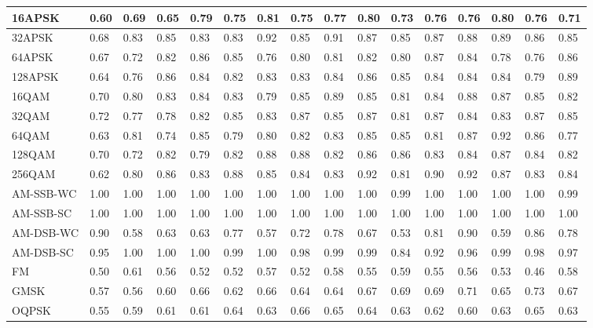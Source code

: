 \documentclass[conference]{IEEEtran}
\begin{document}
\begin{table}[H]
\begin{tabular}{|l|l|l|l|l|l|l|l|l|l|l|l|l|l|l|l|}
\hline 16APSK & 0.60 & 0.69 & 0.65 & 0.79 & 0.75 & 0.81 & 0.75 & 0.77 & 0.80 & 0.73 & 0.76 & 0.76 & 0.80 & 0.76 & 0.71 \\
\hline 32APSK & 0.68 & 0.83 & 0.85 & 0.83 & 0.83 & 0.92 & 0.85 & 0.91 & 0.87 & 0.85 & 0.87 & 0.88 & 0.89 & 0.86 & 0.85 \\
\hline 64APSK & 0.67 & 0.72 & 0.82 & 0.86 & 0.85 & 0.76 & 0.80 & 0.81 & 0.82 & 0.80 & 0.87 & 0.84 & 0.78 & 0.76 & 0.86 \\
\hline 128APSK & 0.64 & 0.76 & 0.86 & 0.84 & 0.82 & 0.83 & 0.83 & 0.84 & 0.86 & 0.85 & 0.84 & 0.84 & 0.84 & 0.79 & 0.89 \\
\hline 16QAM  & 0.70 & 0.80 & 0.83 & 0.84 & 0.83 & 0.79 & 0.85 & 0.89 & 0.85 & 0.81 & 0.84 & 0.88 & 0.87 & 0.85 & 0.82 \\
\hline 32QAM  & 0.72 & 0.77 & 0.78 & 0.82 & 0.85 & 0.83 & 0.87 & 0.85 & 0.87 & 0.81 & 0.87 & 0.84 & 0.83 & 0.87 & 0.85 \\
\hline 64QAM  & 0.63 & 0.81 & 0.74 & 0.85 & 0.79 & 0.80 & 0.82 & 0.83 & 0.85 & 0.85 & 0.81 & 0.87 & 0.92 & 0.86 & 0.77 \\
\hline 128QAM & 0.70 & 0.72 & 0.82 & 0.79 & 0.82 & 0.88 & 0.88 & 0.82 & 0.86 & 0.86 & 0.83 & 0.84 & 0.87 & 0.84 & 0.82 \\
\hline 256QAM & 0.62 & 0.80 & 0.86 & 0.83 & 0.88 & 0.85 & 0.84 & 0.83 & 0.92 & 0.81 & 0.90 & 0.92 & 0.87 & 0.83 & 0.84 \\
\hline AM-SSB-WC & 1.00 & 1.00 & 1.00 & 1.00 & 1.00 & 1.00 & 1.00 & 1.00 & 1.00 & 0.99 & 1.00 & 1.00 & 1.00 & 1.00 & 0.99 \\
\hline AM-SSB-SC & 1.00 & 1.00 & 1.00 & 1.00 & 1.00 & 1.00 & 1.00 & 1.00 & 1.00 & 1.00 & 1.00 & 1.00 & 1.00 & 1.00 & 1.00 \\
\hline AM-DSB-WC & 0.90 & 0.58 & 0.63 & 0.63 & 0.77 & 0.57 & 0.72 & 0.78 & 0.67 & 0.53 & 0.81 & 0.90 & 0.59 & 0.86 & 0.78 \\
\hline AM-DSB-SC & 0.95 & 1.00 & 1.00 & 1.00 & 0.99 & 1.00 & 0.98 & 0.99 & 0.99 & 0.84 & 0.92 & 0.96 & 0.99 & 0.98 & 0.97 \\
\hline FM & 0.50 & 0.61 & 0.56 & 0.52 & 0.52 & 0.57 & 0.52 & 0.58 & 0.55 & 0.59 & 0.55 & 0.56 & 0.53 & 0.46 & 0.58 \\
\hline GMSK & 0.57 & 0.56 & 0.60 & 0.66 & 0.62 & 0.66 & 0.64 & 0.64 & 0.67 & 0.69 & 0.69 & 0.71 & 0.65 & 0.73 & 0.67 \\
\hline OQPSK & 0.55 & 0.59 & 0.61  & 0.61  & 0.64  & 0.63 & 0.66  & 0.65 & 0.64  & 0.63 & 0.62 & 0.60 & 0.63  & 0.65  & 0.63\\
\hline
\end{tabular}
\label{CHAODA AUC Scores 2 to 30}
\end{table}
\end{document}
